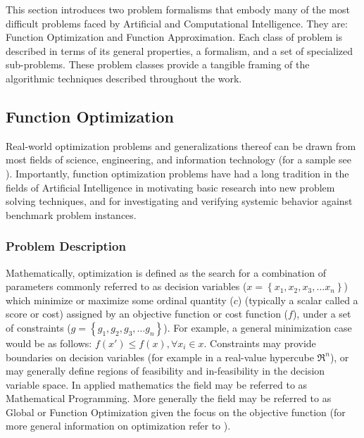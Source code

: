 \begin{bibunit}
This section introduces two problem formalisms that embody many of the most difficult problems faced by Artificial and Computational Intelligence. They are: Function Optimization and Function Approximation. Each class of problem is described in terms of its general properties, a formalism, and a set of specialized sub-problems. These problem classes provide a tangible framing of the algorithmic techniques described throughout the work.

% 
%
\subsection{Function Optimization}
\label{subsec:function_optimization}
Real-world optimization problems and generalizations thereof can be drawn from most fields of science, engineering, and information technology (for a sample see \cite{Ali1997, Toern1999}). Importantly, function optimization problems have had a long tradition in the fields of Artificial Intelligence in motivating basic research into new problem solving techniques, and for investigating and verifying systemic behavior against benchmark problem instances.

%
%
\subsubsection{Problem Description}
Mathematically, optimization is defined as the search for a combination of parameters commonly referred to as decision variables ($x = \left\{x_1, x_2, x_3, \ldots x_n\right\}$) which minimize or maximize some ordinal quantity ($c$) (typically a scalar  called a score or cost) assigned by an objective function or cost function ($f$), under a set of constraints ($g = \left\{g_1, g_2, g_3, \ldots g_n\right\}$). For example, a general minimization case would be as follows: $f(x') \leq f(x), \forall x_i \in x$. Constraints may provide boundaries on decision variables (for example in a real-value hypercube $\Re^n$), or may generally define regions of feasibility and in-feasibility in the decision variable space. In applied mathematics the field may be referred to as Mathematical Programming. More generally the field may be referred to as Global or Function Optimization given the focus on the objective function (for more general information on optimization refer to \cite{Horst2000}). 

%
%

\end{bibunit}
